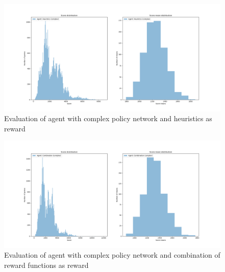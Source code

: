 \documentclass[11pt, fleqn]{article}
\begin{document}
\begin{figure}[H]
	\centering
	\includegraphics[width=\linewidth]{"eval_heuristics_complex"}
	\caption{Evaluation of agent with complex policy network and heuristics as reward}
\end{figure}

\begin{figure}[H]
	\centering
	\includegraphics[width=\linewidth]{"eval_combination_complex"}
	\caption{Evaluation of agent with complex policy network and combination of reward functions as reward}
\end{figure}
\end{document}

